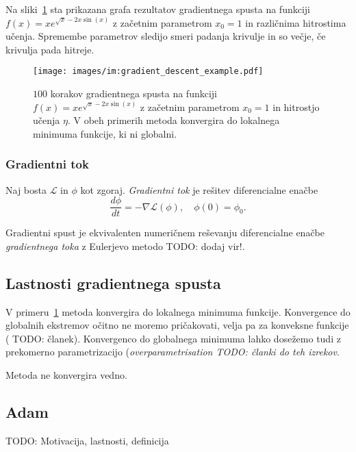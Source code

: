\documentclass[mat2, tisk]{fmfdelo}
\newcommand{\TODO}[1]{{\color{blue} TODO: #1}}
\begin{document}
\begin{primer}
Na sliki~\ref{fig:primer gradientnega spusta} sta prikazana grafa rezultatov gradientnega spusta na funkciji $f(x) = x e^{\sqrt{x} - 2x\sin(x)}$ z začetnim parametrom $x_0 = 1$ in različnima hitrostima učenja. Spremembe parametrov sledijo smeri padanja krivulje in so večje, če krivulja pada hitreje. 
           \begin{figure}[ht]
  \centering
  \texttt{[image: images/im:gradient\_descent\_example.pdf]}
  \caption[Primer delovanja gradientnega spusta.]{$100$ korakov gradientnega spusta na funkciji $f(x) = x e^{\sqrt{x} - 2x\sin(x)}$ z začetnim parametrom $x_0=1$ in hitrostjo učenja $\eta$. V obeh primerih metoda konvergira do lokalnega minimuma funkcije, ki ni globalni. }
  \label{fig:primer gradientnega spusta}
\end{figure}
\end{primer}

       


    
  
        \subsubsection{Gradientni tok}
        Naj bosta $\mathcal{L}$ in $\phi$ kot zgoraj. \emph{Gradientni tok} je rešitev diferencialne enačbe
        \begin{equation}
            \label{eq:gradient flow}
            \frac{d\phi}{d t} = - \nabla \mathcal{L}(\phi), \quad \phi(0)=\phi_0.
        \end{equation}
        
        Gradientni spust je ekvivalenten numeričnem reševanju diferencialne enačbe \emph{gradientnega toka} z Eulerjevo metodo \TODO{dodaj vir!}. 

    \subsection{Lastnosti gradientnega spusta}
    V primeru~\ref{fig:primer gradientnega spusta} metoda konvergira do lokalnega minimuma funkcije. Konvergence do globalnih ekstremov očitno ne moremo pričakovati, velja pa za konveksne funkcije (\TODO{članek}). Konvergenco do globalnega minimuma lahko dosežemo tudi z prekomerno parametrizacijo (\emph{overparametrisation \TODO{članki do teh izrekov}}.

    Metoda ne konvergira vedno. 
    
    \subsection{Adam}
        \TODO{Motivacija, lastnosti, definicija}
\end{document}

